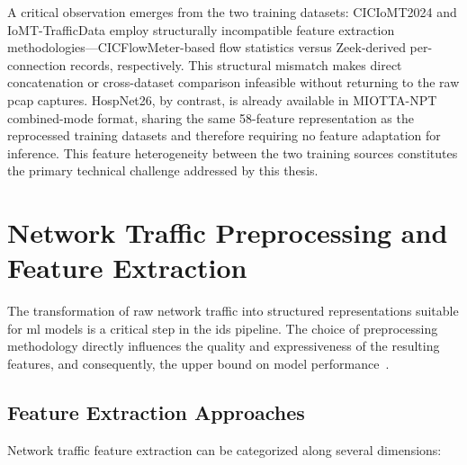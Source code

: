 A critical observation emerges from the two training datasets: CICIoMT2024 and IoMT-TrafficData employ structurally incompatible feature extraction methodologies---CICFlowMeter-based flow statistics versus Zeek-derived per-connection records, respectively. This structural mismatch makes direct concatenation or cross-dataset comparison infeasible without returning to the raw \gls{pcap} captures. HospNet26, by contrast, is already available in MIOTTA-NPT combined-mode format, sharing the same 58-feature representation as the reprocessed training datasets and therefore requiring no feature adaptation for inference. This feature heterogeneity between the two training sources constitutes the primary technical challenge addressed by this thesis.

\section{Network Traffic Preprocessing and Feature Extraction}
\label{sec:preprocessing}

The transformation of raw network traffic into structured representations suitable for \gls{ml} models is a critical step in the \gls{ids} pipeline. The choice of preprocessing methodology directly influences the quality and expressiveness of the resulting features, and consequently, the upper bound on model performance~\cite{leon2025miotta}.

\subsection{Feature Extraction Approaches}
\label{subsec:extraction-approaches}

Network traffic feature extraction can be categorized along several dimensions:

